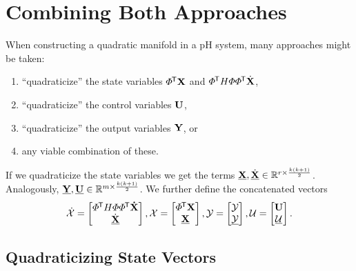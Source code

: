 \section{Combining Both Approaches}

When constructing a quadratic manifold in a pH system, many approaches might be taken:
\begin{enumerate}
    \item ``quadraticize'' the state variables $\varPhi^{\mkern-1.5mu \mathsf{T}} \mathbf{X}$ and $\varPhi^{\mkern-1.5mu \mathsf{T}} H \varPhi \varPhi^{\mkern-1.5mu \mathsf{T}} \dot{\mathbf{X}}$,
    \item ``quadraticize'' the control variables $\mathbf{U}$,
    \item ``quadraticize'' the output variables $\mathbf{Y}$, or
    \item any viable combination of these.
\end{enumerate}

If we quadraticize the state variables we get the terms $\underline{\mathbf{X}}, \underline{\dot{\mathbf{X}}} \in \mathbb{R}^{r \times \frac{k (k + 1)}{2}}$.
Analogously, $\underline{\mathbf{Y}}, \underline{\mathbf{U}} \in \mathbb{R}^{m \times \frac{k (k + 1)}{2}}$.
We further define the concatenated vectors
\[
    \dot{\mathcal{X}} =
    \begin{bmatrix}
        \varPhi^{\mkern-1.5mu \mathsf{T}} H \varPhi \varPhi^{\mkern-1.5mu \mathsf{T}} \mathbf{\dot{X}} \\
        \underline{\dot{\mathbf{X}}}
    \end{bmatrix},
    \mathcal{X} =
    \begin{bmatrix}
        \varPhi^{\mkern-1.5mu \mathsf{T}} \mathbf{X} \\
        \underline{\mathbf{X}}
    \end{bmatrix},
    \mathcal{Y} =
    \begin{bmatrix}
        \mathcal{Y} \\
        \underline{\mathcal{Y}}
    \end{bmatrix},
    \mathcal{U} =
    \begin{bmatrix}
        \mathbf{U} \\
        \underline{\mathcal{U}}
    \end{bmatrix}.
\]

\subsection{Quadraticizing State Vectors}\label{subseq:quad-state-vecs}

